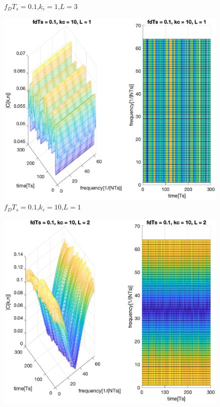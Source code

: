 \documentclass[conference]{IEEEtran}
\begin{document}
\begin{appendices}
\begin{figure}[H]
        \caption{$f_{D}T_{s}=0.1$,$k_{c}=1$,$L=3$}
        \label{01_1_3}
    \end{figure}
    \begin{figure}[H]
        \centering
        \includegraphics[width=\linewidth]{Task2/01_10_1.eps}
        \caption{$f_{D}T_{s}=0.1$,$k_{c}=10$,$L=1$}
        \label{01_10_1}
    \end{figure}
    \begin{figure}[H]
        \centering
        \includegraphics[width=\linewidth]{Task2/01_10_2.eps}

\end{figure}
\end{appendices}
\end{document}

